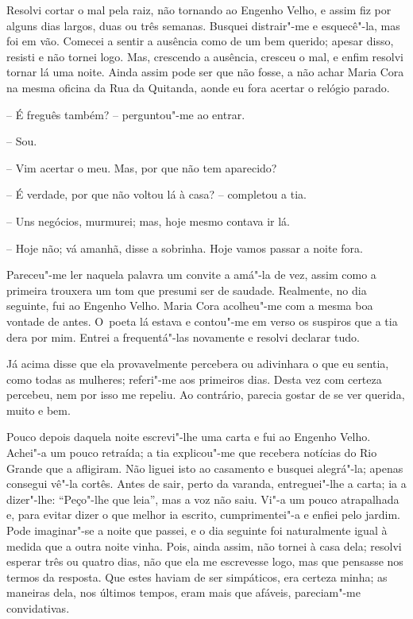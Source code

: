 Resolvi cortar o mal pela raiz, não tornando ao Engenho Velho, e assim
fiz por alguns dias largos, duas ou três semanas. Busquei distrair"-me e
esquecê"-la, mas foi em vão. Comecei a sentir a ausência como de um bem
querido; apesar disso, resisti e não tornei logo. Mas, crescendo a
ausência, cresceu o mal, e enfim resolvi tornar lá uma noite. Ainda
assim pode ser que não fosse, a não achar Maria Cora na mesma oficina da
Rua da Quitanda, aonde eu fora acertar o relógio parado.

-- É freguês também? -- perguntou"-me ao entrar.

-- Sou.

-- Vim acertar o meu. Mas, por que não tem aparecido?

-- É verdade, por que não voltou lá à casa? -- completou a tia.

-- Uns negócios, murmurei; mas, hoje mesmo contava ir lá.

-- Hoje não; vá amanhã, disse a sobrinha. Hoje vamos passar a noite
fora.

Pareceu"-me ler naquela palavra um convite a amá"-la de vez, assim como a
primeira trouxera um tom que presumi ser de saudade. Realmente, no dia
seguinte, fui ao Engenho Velho. Maria Cora acolheu"-me com a mesma boa
vontade de antes. O~poeta lá estava e contou"-me em verso os suspiros que
a tia dera por mim. Entrei a frequentá"-las novamente e resolvi declarar
tudo.

Já acima disse que ela provavelmente percebera ou adivinhara o que eu
sentia, como todas as mulheres; referi"-me aos primeiros dias. Desta vez
com certeza percebeu, nem por isso me repeliu. Ao contrário, parecia
gostar de se ver querida, muito e bem.

Pouco depois daquela noite escrevi"-lhe uma carta e fui ao Engenho Velho.
Achei"-a um pouco retraída; a tia explicou"-me que recebera notícias do
Rio Grande que a afligiram. Não liguei isto ao casamento e busquei
alegrá"-la; apenas consegui vê"-la cortês. Antes de sair, perto da
varanda, entreguei"-lhe a carta; ia a dizer"-lhe: ``Peço"-lhe que leia'',
mas a voz não saiu. Vi"-a um pouco atrapalhada e, para evitar dizer o que
melhor ia escrito, cumprimentei"-a e enfiei pelo jardim. Pode imaginar"-se
a noite que passei, e o dia seguinte foi naturalmente igual à medida que
a outra noite vinha. Pois, ainda assim, não tornei à casa dela; resolvi
esperar três ou quatro dias, não que ela me escrevesse logo, mas que
pensasse nos termos da resposta. Que estes haviam de ser simpáticos, era
certeza minha; as maneiras dela, nos últimos tempos, eram mais que
afáveis, pareciam"-me convidativas.

